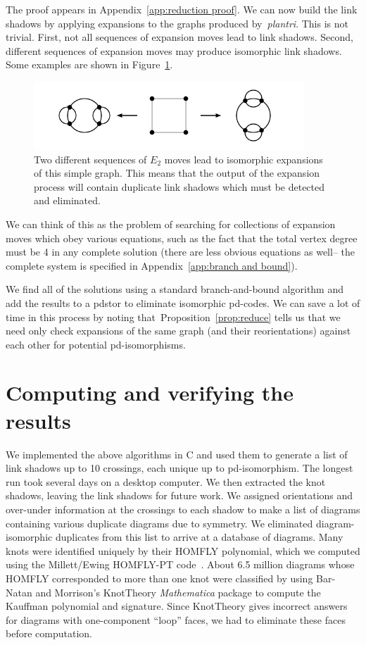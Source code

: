 \documentclass[amsmath,secnumarabic,floatfix,amssymb,nofootinbib,nobibnotes,letterpaper,11pt,tightenlines,showkeys]{revtex4}
\theoremstyle{definition}
\newcommand{\edgedouble}{E_2}
\let\mgp=\marginpar \marginparwidth18mm \marginparsep1mm
\def\marginpar#1{\mgp{\raggedright\tiny #1}}
\let\lbl=\label
\def\label#1{\lbl{#1}\ifinner\else\marginpar{\ref{#1} #1}\ignorespaces\fi}
\begin{document}
The proof appears in Appendix~\ref{app:reduction proof}. We can now build the link shadows by applying expansions to the graphs produced by~\emph{plantri}. This is not trivial. First, not all sequences of expansion moves lead to link shadows. Second,
different sequences of expansion moves may produce isomorphic link shadows. Some examples are shown in 
Figure~\ref{fig:expansion woes}.
\begin{figure}[ht]
\begin{center}
\includegraphics[width=4in]{isomorphic-expansions.pdf}
\end{center}
\caption{Two different sequences of $\edgedouble$ moves lead to isomorphic expansions of this simple graph. This means that the output of the expansion process will contain duplicate link shadows which must be detected and eliminated.}
\label{fig:expansion woes}
\end{figure}

We can think of this as the problem of searching for collections of expansion moves which obey various equations, such as the fact that the total vertex degree must be 4 in any complete solution (there are less obvious equations as well-- the complete system is specified in Appendix~\ref{app:branch and bound}). 

We find all of the solutions using a standard branch-and-bound algorithm and add the results to a pdstor to eliminate isomorphic pd-codes. We can save a lot of time in this process by noting that~Proposition~\ref{prop:reduce} tells us that we need only check expansions of the same graph (and their reorientations) against each other for potential pd-isomorphisms. 

\section{Computing and verifying the results}

We implemented the above algorithms in C and used them to generate a list of link shadows up to 10 crossings, each unique up to pd-isomorphism. The longest run took several days on a desktop computer. We then extracted the knot shadows, leaving the link shadows for future work. We assigned orientations and over-under information at the crossings to each shadow to make a list of diagrams containing various duplicate diagrams due to symmetry. We eliminated diagram-isomorphic duplicates from this list to arrive at a database of diagrams. Many knots were identified uniquely by their HOMFLY polynomial, which we computed using the Millett/Ewing HOMFLY-PT code~\cite{MR98k:57010}. About 6.5 million diagrams whose HOMFLY corresponded to more than one knot were classified by using Bar-Natan and Morrison's KnotTheory \emph{Mathematica} package to compute the Kauffman polynomial and signature. Since KnotTheory gives incorrect answers for diagrams with one-component ``loop'' faces, we had to eliminate these faces before computation.
\end{document}
